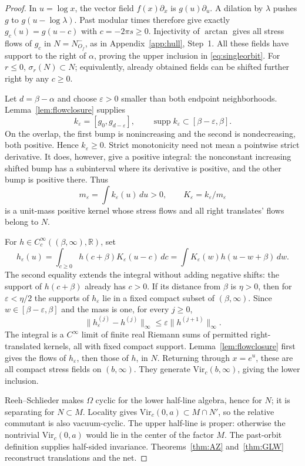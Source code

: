 \documentclass[12pt]{article}
\theoremstyle{definition}
\theoremstyle{remark}
\begin{document}
\begin{proof}
In \(u=\log x\), the vector field \(f(x)\partial_x\) is \(g(u)\partial_u\).
A dilation by \(\lambda\) pushes \(g\) to \(g(u-\log\lambda)\).
Past modular times therefore give exactly \(g_c(u)=g(u-c)\) with
\(c=-2\pi s\ge0\). Injectivity of \(\arctan\) gives all stress flows of
\(g_c\) in \(N=N^-_{O_f}\), as in Appendix~\ref{app:hull}, Step~1.
All these fields have support to the right of \(\alpha\), proving the upper
inclusion in \eqref{eq:singleorbit}. For \(r\le0\),
\(\sigma_r(N)\subset N\); equivalently, already obtained fields can be shifted
further right by any \(c\ge0\).

Let \(d=\beta-\alpha\) and choose \(\varepsilon>0\) smaller than both endpoint
neighborhoods. Lemma~\ref{lem:flowclosure} supplies
\[
 k_\varepsilon=[g_0,g_{d-\varepsilon}],\qquad
 \operatorname{supp}k_\varepsilon\subset[\beta-\varepsilon,\beta].
\]
On the overlap, the first bump is nonincreasing and the second is
nondecreasing, both positive. Hence \(k_\varepsilon\ge0\).
Strict monotonicity need not mean a pointwise strict derivative. It does,
however, give a positive integral: the nonconstant increasing shifted bump
has a subinterval where its derivative is positive, and the other bump is
positive there. Thus
\[
 m_\varepsilon=\int k_\varepsilon(u)\,du>0,\qquad
 K_\varepsilon=k_\varepsilon/m_\varepsilon
\]
is a unit-mass positive kernel whose stress flows and all right translates'
flows belong to \(N\).

For \(h\in C_c^\infty((\beta,\infty),\mathbb R)\), set
\begin{equation}\label{eq:positivekernel}
 h_\varepsilon(u)=\int_{c\ge0}h(c+\beta)K_\varepsilon(u-c)\,dc
                =\int K_\varepsilon(w)h(u-w+\beta)\,dw .
\end{equation}
The second equality extends the integral without adding negative shifts:
the support of \(h(c+\beta)\) already has \(c>0\).
If its distance from \(\beta\) is \(\eta>0\), then for
\(\varepsilon<\eta/2\) the supports of \(h_\varepsilon\) lie in a fixed
compact subset of \((\beta,\infty)\). Since
\(w\in[\beta-\varepsilon,\beta]\) and the mass is one, for every \(j\ge0\),
\[
 \|h_\varepsilon^{(j)}-h^{(j)}\|_\infty
 \le\varepsilon\|h^{(j+1)}\|_\infty .
\]
The integral is a \(C^\infty\) limit of finite real Riemann sums of permitted
right-translated kernels, all with fixed compact support. Lemma~\ref{lem:flowclosure}
first gives the flows of \(h_\varepsilon\), then those of \(h\), in \(N\).
Returning through \(x=e^u\), these are all compact stress fields on
\((b,\infty)\). They generate \(\mathrm{Vir}_c(b,\infty)\), giving the lower
inclusion.

Reeh--Schlieder makes \(\Omega\) cyclic for the lower half-line algebra, hence
for \(N\); it is separating for \(N\subset M\). Locality gives
\(\mathrm{Vir}_c(0,a)\subset M\cap N'\), so the relative commutant is also
vacuum-cyclic. The upper half-line is proper: otherwise the nontrivial
\(\mathrm{Vir}_c(0,a)\) would lie in the center of the factor \(M\).
The past-orbit definition supplies half-sided invariance.
Theorems~\ref{thm:AZ} and~\ref{thm:GLW} reconstruct translations and the net.
\end{proof}
\end{document}
